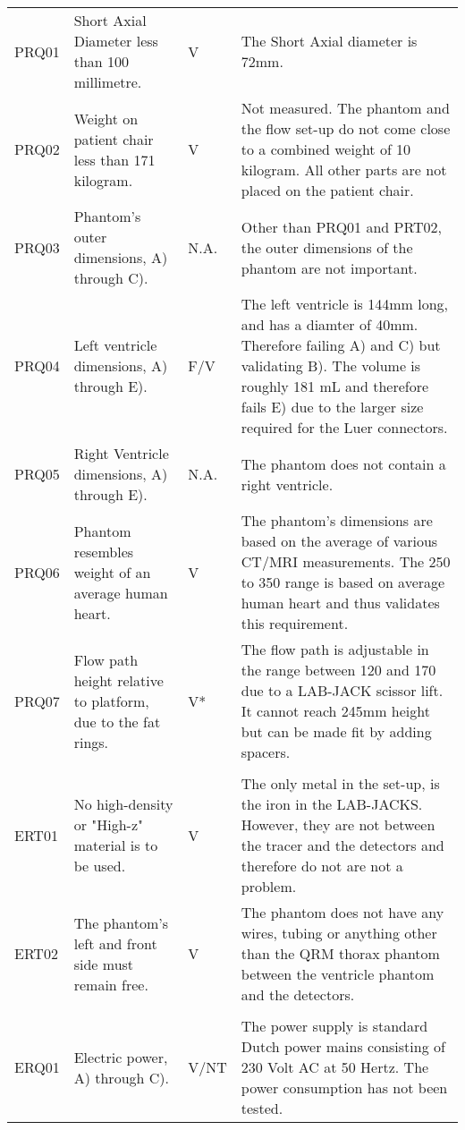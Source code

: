 \begin{longtable}{m{1.5cm}|m{5.25cm}>{\centering\arraybackslash}m{1cm}m{5.75cm}|}
		PRQ01	&	Short Axial Diameter less than 100 millimetre. & \cellcolor{green!50}V & The Short Axial diameter is 72mm. \\
		PRQ02	& Weight on patient chair less than 171 kilogram. & \cellcolor{green!50}V & Not measured. The phantom and the flow set-up do not come close to a combined weight of 10 kilogram. All other parts are not placed on the patient chair. \\
		PRQ03	& Phantom's outer dimensions, A) through C). & \cellcolor{blue!50}N.A. & Other than PRQ01 and PRT02, the outer dimensions of the phantom are not important.\\
		PRQ04	& Left ventricle dimensions, A) through E). & \cellcolor{yellow!50}F/V & The left ventricle is 144mm long, and has a diamter of 40mm. Therefore failing A) and C) but validating B). The volume is roughly 181 mL and therefore fails E) due to the larger size required for the Luer connectors. \\
		PRQ05	& Right Ventricle dimensions, A) through E). & \cellcolor{blue!50}N.A. & The phantom does not contain a right ventricle. \\
		PRQ06	& Phantom resembles weight of an average human heart. & \cellcolor{green!50}V & The phantom's dimensions are based on the average of various CT/MRI measurements. The 250 to 350 range is based on average human heart and thus validates this requirement. \\
		PRQ07	& Flow path height relative to platform, due to the fat rings. & \cellcolor{yellow!50}V* & The flow path is adjustable in the range between 120 and 170 due to a LAB-JACK scissor lift. It cannot reach 245mm height but can be made fit by adding spacers. \\
					& & & \\
		ERT01	& No high-density or "High-z" material is to be used. & \cellcolor{green!50}V & The only metal in the set-up, is the iron in the LAB-JACKS. However, they are not between the tracer and the detectors and therefore do not are not a problem. \\
		ERT02	& The phantom's left and front side must remain free. & \cellcolor{green!50}V & The phantom does not have any wires, tubing or anything other than the QRM thorax phantom between the ventricle phantom and the detectors. \\
					& & & \\
		ERQ01	& Electric power, A) through C). & \cellcolor{blue!50}V/NT & The power supply is standard Dutch power mains consisting of 230 Volt AC at 50 Hertz.  The power consumption has not been tested. \\

\end{longtable}
